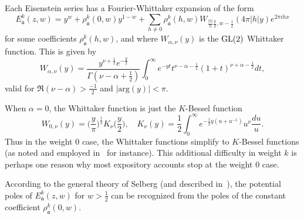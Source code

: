 Each Eisenstein series has a Fourier-Whittaker expansion of the form
\begin{equation}
  E_\mathfrak{a}^k(z,w) = y^w + \rho_\mathfrak{a}^k(0, w) y^{1-w} + \sum_{h \neq 0}
  \rho_\mathfrak{a}^k(h, w) W_{\frac{|h|}{h}\frac{k}{2}, w - \frac{1}{2}}(4\pi \lvert h
  \rvert y) e^{2\pi i h x}
\end{equation}
for some coefficients $\rho_\mathfrak{a}^k(h,w)$, and where $W_{\alpha, \nu}(y)$ is the
$\operatorname{GL}(2)$ Whittaker function.
This is given by~\cite[3.6.3]{GoldfeldHundleyI}
\begin{equation}
  W_{\alpha, \nu}(y) = \frac{y^{\nu + \frac{1}{2}}
  e^{-\frac{y}{2}}}{\Gamma(\nu - \alpha + \frac{1}{2})}
  \int_0^\infty e^{-yt} t^{\nu - \alpha - \frac{1}{2}}
  (1+t)^{\nu + \alpha - \frac{1}{2}} dt,
\end{equation}
valid for $\Re(\nu - \alpha) > \frac{-1}{2}$
and $\lvert \text{arg}(y) \rvert < \pi$.


When $\alpha = 0$, the Whittaker function is just the $K$-Bessel function
\begin{equation}
  W_{0, \nu}(y) = \big( \frac{y}{\pi}\big)^{\frac{1}{2}} K_\nu\big( \frac{y}{2} \big),
  \quad
  K_\nu(y) = \frac{1}{2} \int_0^\infty e^{-\frac{1}{2} y(u + u^{-1})}
  u^\nu \frac{du}{u}.
\end{equation}
Thus in the weight $0$ case, the Whittaker functions simplify to $K$-Bessel functions (as
noted and employed in~\cite{Goldfeld2006automorphic} for instance).
This additional difficulty in weight $k$ is perhaps one reason why most expository
accounts stop at the weight $0$ case.


According to the general theory of Selberg (and described in~\cite[Theorem
13.2]{Iwaniec97}), the potential poles of $E_\mathfrak{a}^k(z,w)$ for $w > \frac{1}{2}$
can be recognized from the poles of the constant coefficient $\rho_{\mathfrak{a}}^k(0,w)$.




